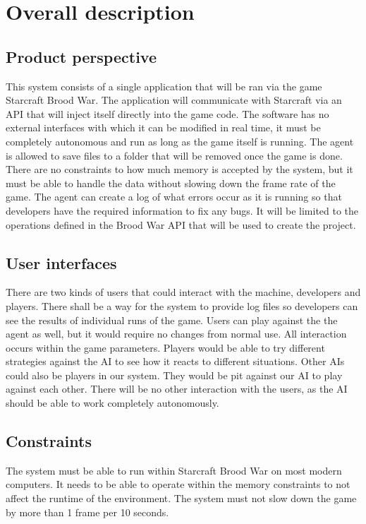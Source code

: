 \newpage

\section{Overall description}

\subsection{Product perspective}
This system consists of a single application that will be ran via the game Starcraft Brood War.
The application will communicate with Starcraft via an API that will inject itself directly into the game code.
The software has no external interfaces with which it can be modified in real time, it must be completely autonomous and run as long as the game itself is running.
The agent is allowed to save files to a folder that will be removed once the game is done. There are no constraints to how much memory is accepted by the system,
but it must be able to handle the data without slowing down the frame rate of the game.
The agent can create a log of what errors occur as it is running so that developers have the required information to fix any bugs.
It will be limited to the operations defined in the Brood War API that will be used to create the project.

\subsection{User interfaces}
There are two kinds of users that could interact with the machine, developers and players.
There shall be a way for the system to provide log files so developers can see the results of individual runs of the game.
Users can play against the the agent as well, but it would require no changes from normal use. All interaction occurs within the game parameters.
Players would be able to try different strategies against the AI to see how it reacts to different situations.
Other AIs could also be players in our system. They would be pit against our AI to play against each other.
There will be no other interaction with the users, as the AI should be able to work completely autonomously.

\subsection{Constraints}
The system must be able to run within Starcraft Brood War on most modern computers. It needs to be able to operate within the memory constraints to not affect the runtime of the environment.
The system must not slow down the game by more than 1 frame per 10 seconds. 

